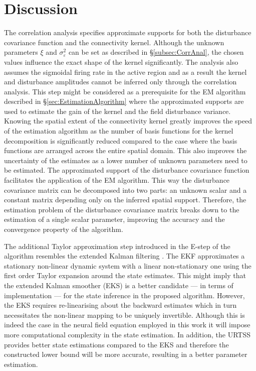 \documentclass[]{article}
\begin{document}
\section{Discussion}\label{sec:EM-Discussion}
The correlation analysis specifies approximate supports for both the disturbance covariance function and the connectivity kernel. Although the unknown parameters $\xi$ and $\sigma_{\varepsilon}^2$ can be set as described in \S\ref{subsec:CorrAnal}, the chosen values influence the exact shape of the kernel significantly. The analysis also assumes the sigmoidal firing rate in the active region and as a result  the kernel and disturbance amplitudes cannot be inferred only through the correlation analysis. This step might be considered as a prerequisite for the EM algorithm described in \S\ref{sec:EstimationAlgorithm} where the approximated supports are used to estimate the gain of the kernel and the field disturbance variance. Knowing the spatial extent of the connectivity kernel greatly improves the speed of the estimation algorithm as the number of basis functions for the kernel decomposition is significantly reduced  compared to the case where the basis functions are arranged across the entire spatial domain. This also improves the uncertainty of the estimates as a lower number of unknown parameters need to be estimated. The approximated support of the disturbance covariance function facilitates the application of the EM algorithm. This way the disturbance covariance matrix can be decomposed into two parts: an unknown scalar and a constant matrix depending only on the inferred spatial support. Therefore, the estimation problem of the disturbance covariance matrix breaks down to the estimation of a single scalar parameter, improving the accuracy and the convergence property of the algorithm.

The additional Taylor approximation step introduced in the E-step of the algorithm resembles the extended Kalman filtering \cite{Jazwinski1970,Chui2009}. The EKF approximates a stationary non-linear dynamic system with a linear non-stationary one using the first order Taylor expansion around the state estimates. This might imply that the extended Kalman smoother (EKS) is a better candidate --- in terms of implementation --- for the state inference in the proposed algorithm. However, the EKS requires re-linearising about the backward estimates which in turn necessitates the non-linear mapping to be uniquely invertible. Although this is indeed the case in the neural field equation employed in this work it will impose more computational complexity in the state estimation. In addition, the URTSS provides better state estimations compared to the EKS \cite{Haykin2001} and therefore the constructed lower bound will be more accurate, resulting in a better parameter estimation.
\end{document}
